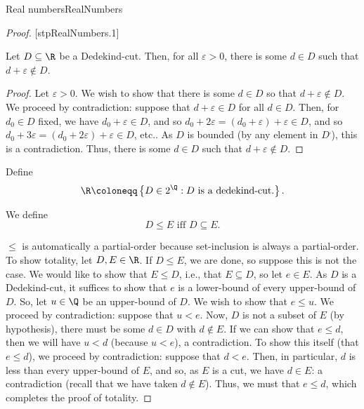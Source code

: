 \begin{thm}{Real numbers}{RealNumbers}
\begin{rmk}
\end{rmk}
\begin{proof}
[stpRealNumbers.1]
\begin{lma}[breakable=false]{}{}
Let $D\subseteq \R$ be a Dedekind-cut.  Then, for all $\varepsilon >0$, there is some $d\in D$ such that $d+\varepsilon \notin D$.
\begin{proof}
Let $\varepsilon >0$.  We wish to show that there is some $d\in D$ so that $d+\varepsilon \notin D$.  We proceed by contradiction:  suppose that $d+\varepsilon \in D$ for all $d\in D$.  Then, for $d_0\in D$ fixed, we have $d_0+\varepsilon \in D$, and so $d_0+2\varepsilon =(d_0+\varepsilon )+\varepsilon \in D$, and so $d_0+3\varepsilon =(d_0+2\varepsilon )+\varepsilon \in D$, etc..  As $D$ is bounded (by any element in $D^{\comp}$), this is a contradiction.  Thus, there is some $d\in D$ such that $d+\varepsilon \notin D$.  
\end{proof}
\end{lma}

Define
\begin{equation}
\R \coloneqq \left\{ D\in 2^{\Q}:D\text{ is a dedekind-cut.}\right\} .
\end{equation}

We define
\begin{equation}
D\leq E\text{ iff }D\subseteq E.
\end{equation}

$\leq$ is automatically a partial-order because set-inclusion is always a partial-order.  To show totality, let $D,E\in \R$.  If $D\leq E$, we are done, so suppose this is not the case.  We would like to show that $E\leq D$, i.e., that $E\subseteq D$, so let $e\in E$.  As $D$ is a Dedekind-cut, it suffices to show that $e$ is a lower-bound of every upper-bound of $D$.  So, let $u\in \Q$ be an upper-bound of $D$.  We wish to show that $e\leq u$.  We proceed by contradiction:  suppose that $u<e$.  Now, $D$ is not a subset of $E$ (by hypothesis), there must be some $d\in D$ with $d\notin E$.  If we can show that $e\leq d$, then we will have $u<d$ (because $u<e$), a contradiction.  To show this itself (that $e\leq d$), we proceed by contradiction:  suppose that $d<e$.  Then, in particular, $d$ is less than every upper-bound of $E$, and so, as $E$ is a cut, we have $d\in E$:  a contradiction (recall that we have taken $d\notin E$).  Thus, we must that $e\leq d$, which completes the proof of totality.


\end{proof}
\end{thm}
